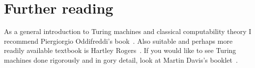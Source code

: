 \section{Further reading}
\label{sec:models-further-reading}

As a general introduction to Turing machines and classical
computability theory I recommend Piergiorgio Oddifreddi's
book~\cite{Oddifreddi}. Also suitable and perhaps more readily
available textbook is Hartley Rogers~\cite{Rogers}. If you would like
to see Turing machines done rigorously and in gory detail, look at
Martin Davis's booklet~\cite{Davis}.




